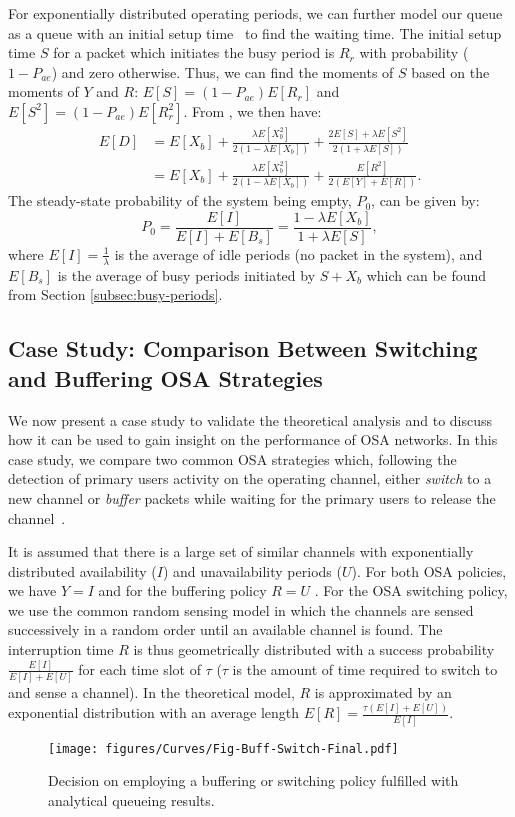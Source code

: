 \documentclass[11pt,journal,oneside,onecolumn,draftclsnofoot]{IEEEtran}
\begin{document}
For exponentially distributed operating periods,  we can further model our queue as a queue with an initial setup time~\cite{takagi91} to find the waiting time. The initial setup time $S$ for a packet which initiates the busy period is $R_r$ with probability ($1-P_{ae}$) and zero otherwise. Thus, we can find the moments of $S$ based on the moments of $Y$ and $R$: $E[S]=(1-P_{ae})E[R_r]$ and $E[S^2]=(1-P_{ae})E[R^2_r]$. From \cite[(2.44a)]{takagi91}, we then have:
\begin{align}
E[D]&=E[X_b]+\frac{\lambda E[X_b^2]}{2(1-\lambda E[X_b])}+\frac{2E[S]+\lambda E[S^2]}{2(1+\lambda E[S])} \nonumber \\
&=E[X_b]+\frac{\lambda E[X_b^2]}{2(1-\lambda E[X_b])}+\frac{E[R^2]}{2(E[Y]+E[R])}.
\label{eq:eq:waiting-with-vacation2}
\end{align}
The steady-state probability of the system being empty, $P_0$, can be given by: 
\begin{equation}
P_0=\frac{E[I]}{E[I]+E[B_s]} = \frac{1-\lambda E[X_b]}{1+\lambda E[S]},
\label{eq:P0-original}
\end{equation}
where $E[I]=\frac{1}{\lambda}$ is the average of idle periods (no packet in the system), and $E[B_s]$ is the average of busy periods initiated by $S+X_b$ which can be found from Section \ref{subsec:busy-periods}.

 
\subsection{Case Study: Comparison Between Switching and Buffering OSA Strategies}
\label{subsec:case-study}
We now present a case study to validate the theoretical analysis and to discuss how it can be used to gain insight on the performance of OSA networks. 
In this case study, we compare two common OSA strategies which, following the detection of primary users activity on the operating channel, either \emph{switch} to a new channel or \emph{buffer} packets while waiting for the primary users to release the channel~\cite{park11,lai11}.

It is assumed that there is a large set of similar channels with exponentially distributed availability ($I$) and unavailability periods ($U$). For both OSA policies, we have $Y=I$ and for the buffering policy $R=U$ \cite{azarfar12e}. For the OSA switching policy, we use the common random sensing model in which the channels are sensed successively in a random order until an available channel is found. The interruption time $R$ is thus geometrically distributed with a success probability $\frac{E[I]}{E[I]+E[U]}$ for each time slot of $\tau$ ($\tau$ is the amount of time required to switch to and sense a channel). In the theoretical model, $R$ is approximated by an exponential distribution with an average length $E[R]=\frac{\tau(E[I]+E[U])}{E[I]}$.
\begin{figure}\texttt{[image: figures/Curves/Fig-Buff-Switch-Final.pdf]}\caption{Decision on employing a buffering or switching policy fulfilled with analytical queueing results.}\label{Fig-Buff-Switch-Final}\end{figure}
\end{document}
